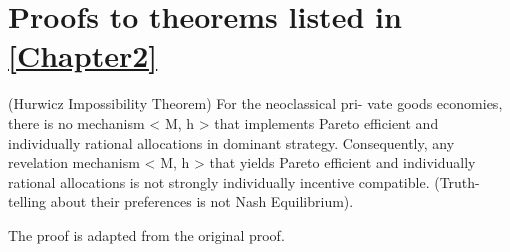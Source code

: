 
\chapter{Proofs to theorems listed in \ref{Chapter2}} %

\label{Appendix_B} %

\begin{thm*}
(Hurwicz Impossibility Theorem) For the neoclassical pri-
vate goods economies, there is no mechanism < M, h > that implements Pareto efficient
and individually rational allocations in dominant strategy. Consequently, any revelation
mechanism < M, h > that yields Pareto efficient and individually rational allocations is
not strongly individually incentive compatible. (Truth-telling about their preferences is not
Nash Equilibrium).
\end{thm*}
The proof is adapted from the original proof.
